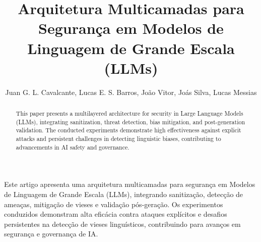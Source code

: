 \documentclass[12pt]{article}
\title{Arquitetura Multicamadas para Segurança em Modelos de Linguagem de Grande Escala (LLMs)}
\author{Juan G. L. Cavalcante\inst{1}, Lucas E. S. Barros\inst{1}, João Vitor\inst{1}, Joás Silva\inst{1}, Lucas Messias\inst{1} }
\begin{document}
 

\maketitle

\begin{abstract}
This paper presents a multilayered architecture for security in Large Language Models (LLMs), integrating sanitization, threat detection, bias mitigation, and post-generation validation. The conducted experiments demonstrate high effectiveness against explicit attacks and persistent challenges in detecting linguistic biases, contributing to advancements in AI safety and governance.

\end{abstract}
     
\begin{resumo} 
  Este artigo apresenta uma arquitetura multicamadas para segurança em Modelos de Linguagem de Grande Escala (LLMs), integrando sanitização, detecção de ameaças, mitigação de vieses e validação pós-geração. Os experimentos conduzidos demonstram alta eficácia contra ataques explícitos e desafios persistentes na detecção de vieses linguísticos, contribuindo para avanços em segurança e governança de IA.
\end{resumo}














\end{document}
